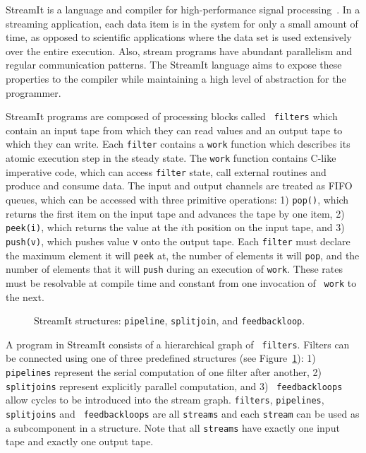 StreamIt is a language and compiler for high-performance signal
processing~\cite{gordon-thesis,streamit-asplos,streamitcc}.  In a
streaming application, each data item is in the system for only a
small amount of time, as opposed to scientific applications where the
data set is used extensively over the entire execution.  Also, stream
programs have abundant parallelism and regular communication patterns.
The StreamIt language aims to expose these properties to the compiler
while maintaining a high level of abstraction for the programmer.

StreamIt programs are composed of processing blocks called {\tt
filters} which contain an input tape from which they can read values
and an output tape to which they can write. Each {\tt filter} contains
a {\tt work} function which describes its atomic execution step in the
steady state.  The {\tt work} function contains C-like imperative
code, which can access {\tt filter} state, call external routines and
produce and consume data.  The input and output channels are treated
as FIFO queues, which can be accessed with three primitive operations:
1) {\tt pop()}, which returns the first item on the input tape and
advances the tape by one item, 2) {\tt peek(i)}, which returns the
value at the $i$th position on the input tape, and 3) {\tt push(v)},
which pushes value {\tt v} onto the output tape.  Each {\tt filter}
must declare the maximum element it will {\tt peek} at, the number of
elements it will {\tt pop}, and the number of elements that it will
{\tt push} during an execution of {\tt work}.  These rates must be
resolvable at compile time and constant from one invocation of {\tt
work} to the next.  

\begin{figure}[t]
\center
\epsfxsize=3.0in
\vspace{-12pt}
\caption{StreamIt structures: {\tt pipeline}, {\tt splitjoin}, and {\tt feedbackloop}.
\protect\label{fig:structures}}
\vspace{-12pt}
\end{figure}

A program in StreamIt consists of a hierarchical graph of {\tt
filters}.  Filters can be connected using one of three predefined
structures (see Figure~\ref{fig:structures}): 1) {\tt pipelines}
represent the serial computation of one filter after another, 2) {\tt
splitjoins} represent explicitly parallel computation, and 3) {\tt
feedbackloops} allow cycles to be introduced into the stream graph.
{\tt filters}, {\tt pipelines}, {\tt splitjoins} and {\tt
feedbackloops} are all {\tt streams} and each {\tt stream} can be used
as a subcomponent in a structure.  Note that all {\tt streams} have
exactly one input tape and exactly one output tape.

